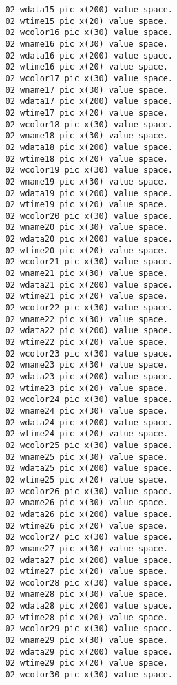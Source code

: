 {{{\begin{verbatim}
          02 wdata15 pic x(200) value space.
          02 wtime15 pic x(20) value space.
          02 wcolor16 pic x(30) value space.
          02 wname16 pic x(30) value space.
          02 wdata16 pic x(200) value space.
          02 wtime16 pic x(20) value space.
          02 wcolor17 pic x(30) value space.
          02 wname17 pic x(30) value space.
          02 wdata17 pic x(200) value space.
          02 wtime17 pic x(20) value space.
          02 wcolor18 pic x(30) value space.
          02 wname18 pic x(30) value space.
          02 wdata18 pic x(200) value space.
          02 wtime18 pic x(20) value space.
          02 wcolor19 pic x(30) value space.
          02 wname19 pic x(30) value space.
          02 wdata19 pic x(200) value space.
          02 wtime19 pic x(20) value space.
          02 wcolor20 pic x(30) value space.
          02 wname20 pic x(30) value space.
          02 wdata20 pic x(200) value space.
          02 wtime20 pic x(20) value space.
          02 wcolor21 pic x(30) value space.
          02 wname21 pic x(30) value space.
          02 wdata21 pic x(200) value space.
          02 wtime21 pic x(20) value space.
          02 wcolor22 pic x(30) value space.
          02 wname22 pic x(30) value space.
          02 wdata22 pic x(200) value space.
          02 wtime22 pic x(20) value space.
          02 wcolor23 pic x(30) value space.
          02 wname23 pic x(30) value space.
          02 wdata23 pic x(200) value space.
          02 wtime23 pic x(20) value space.
          02 wcolor24 pic x(30) value space.
          02 wname24 pic x(30) value space.
          02 wdata24 pic x(200) value space.
          02 wtime24 pic x(20) value space.
          02 wcolor25 pic x(30) value space.
          02 wname25 pic x(30) value space.
          02 wdata25 pic x(200) value space.
          02 wtime25 pic x(20) value space.
          02 wcolor26 pic x(30) value space.
          02 wname26 pic x(30) value space.
          02 wdata26 pic x(200) value space.
          02 wtime26 pic x(20) value space.
          02 wcolor27 pic x(30) value space.
          02 wname27 pic x(30) value space.
          02 wdata27 pic x(200) value space.
          02 wtime27 pic x(20) value space.
          02 wcolor28 pic x(30) value space.
          02 wname28 pic x(30) value space.
          02 wdata28 pic x(200) value space.
          02 wtime28 pic x(20) value space.
          02 wcolor29 pic x(30) value space.
          02 wname29 pic x(30) value space.
          02 wdata29 pic x(200) value space.
          02 wtime29 pic x(20) value space.
          02 wcolor30 pic x(30) value space.

\end{verbatim}}}}
